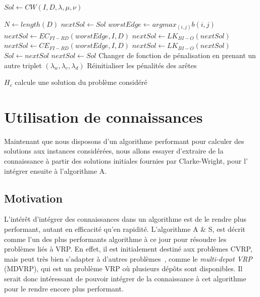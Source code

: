 \documentclass[a4paper,11pt]{article}%
\begin{document}
\begin{algorithm}
\DontPrintSemicolon %
$Sol \gets CW(I,D,\lambda,\mu,\nu)$\;

$N \gets length(D)$\;
$nextSol \gets Sol$\;
 {
	$worstEdge \gets argmax_{(i,j)} b(i,j) $\;
	$nextSol \gets EC_{FI-RD}(worstEdge,I,D)$\;
	$nextSol \gets LK_{BI-O}(nextSol)$\;
	$nextSol \gets CE_{FI-RD}(worstEdge,I,D)$\;
	$nextSol \gets LK_{BI-O}(nextSol)$\;
	 {
		$ Sol \gets nextSol$\;
	}
	 {
		$nextSol \gets Sol$\;
	}
	 {
		Changer de fonction de pénalisation en prenant un autre triplet $(\lambda_w,\lambda_c,\lambda_d)$\;
		Réinitialiser les pénalités des arêtes\;
	}
}
\;
\caption{{\sc $H_c$} calcule une solution du problème considéré}
\label{algo:A}
\end{algorithm}


\section{Utilisation de connaissances}

Maintenant que nous disposons d'un algorithme performant pour calculer des solutions aux instances considérées, nous allons essayer d'extraire de la connaissance à partir des solutions initiales fournies par Clarke-Wright, pour l' intégrer ensuite à l'algorithme A.
 
\subsection{Motivation}
L'intérêt d'intégrer des connaissances dans un algorithme est de le rendre plus performant, autant en efficacité qu'en rapidité. 
L'algorithme A \& S, est décrit comme l'un des plus performants algorithme à ce jour pour résoudre les problèmes liés à VRP. 
En effet, il est initialement destiné aux problèmes CVRP, mais peut très bien s'adapter à d'autres problèmes~\cite{Sorensen_2017}, comme le \emph{multi-depot VRP} (MDVRP), qui est un problème VRP où plusieurs dépôts sont disponibles.
Il serait donc intéressant de pouvoir intégrer de la connaissance à cet algorithme pour le rendre encore plus performant.
\end{document}

